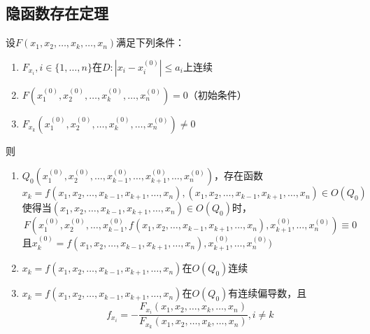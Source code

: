 \subsection{隐函数存在定理}
\begin{theorem}
设$F(x_1,x_2,\ldots,x_k,\ldots,x_n)$满足下列条件：
\begin{enumerate}
	\itemsep-3pt
	\item $F_{x_i},i\in\{1,\ldots,n\}$在$D:|x_i-x_i^{(0)}|\leq a_i$上连续
	\item $F(x_1^{(0)},x_2^{(0)},\ldots,x_k^{(0)},\ldots,x_n^{(0)})=0$（初始条件）
	\item $F_{x_k}(x_1^{(0)},x_2^{(0)},\ldots,x_k^{(0)},\ldots,x_n^{(0)})\ne0$
\end{enumerate}
则
\begin{enumerate}
	\itemsep -3pt
	\item $Q_0(x_1^{(0)},x_2^{(0)},\ldots,x_{k-1}^{(0)},\ldots,x_{k+1}^{(0)},\ldots,x_n^{(0)})$，存在函数\[x_k=f(x_1,x_2,\ldots,x_{k-1},x_{k+1},\ldots,x_n),(x_1,x_2,\ldots,x_{k-1},x_{k+1},\ldots,x_n)\in O(Q_0)\]
	使得当$(x_1,x_2,\ldots,x_{k-1},x_{k+1},\ldots,x_n)\in O(Q_0)$时，
	\[F(x_1^{(0)},x_2^{(0)},\ldots,x_{k-1}^{(0)},f(x_1,x_2,\ldots,x_{k-1},x_{k+1},\ldots,x_n),x_{k+1}^{(0)},\ldots,x_n^{(0)})\equiv 0\]
	且$x_{k}^{(0)}=f(x_1,x_2,\ldots,x_{k-1},x_{k+1},\ldots,x_n),x_{k+1}^{(0)},\ldots,x_n^{(0)})$
	\item $x_k=f(x_1,x_2,\ldots,x_{k-1},x_{k+1},\ldots,x_n)$在$O(Q_0)$连续
	\item $x_k=f(x_1,x_2,\ldots,x_{k-1},x_{k+1},\ldots,x_n)$在$O(Q_0)$有连续偏导数，且
	\[f_{x_i}=-\frac{F_{x_i}(x_1,x_2,\ldots,x_k,\ldots,x_n)}{F_{x_k}(x_1,x_2,\ldots,x_k,\ldots,x_n)},i\ne k\]
\end{enumerate}
\end{theorem}
